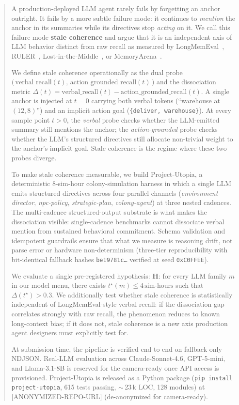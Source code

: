 \begin{abstract}

A production-deployed LLM agent rarely fails by forgetting an anchor
outright. It fails by a more subtle failure mode: it continues to
\emph{mention} the anchor in its summaries while its directives stop
\emph{acting} on it. We call this failure mode \textbf{stale
coherence} and argue that it is an independent axis of LLM behavior
distinct from raw recall as measured by LongMemEval~\citep{Wu2025LongMemEval},
RULER~\citep{Hsieh2024RULER}, Lost-in-the-Middle~\citep{Liu2024LostInMiddle},
or MemoryArena~\citep{He2026MemoryArena}.

We define stale coherence operationally as the dual probe
$\bigl(\,\text{verbal\_recall}(t),\,\text{action\_grounded\_recall}(t)\,\bigr)$
and the dissociation metric
$\Delta(t) = \text{verbal\_recall}(t) - \text{action\_grounded\_recall}(t)$.
A single anchor is injected at $t = 0$ carrying both verbal tokens
(``warehouse at $(12,8)$'') and an implicit action goal
(\texttt{\{deliver, warehouse\}}). At every sample point $t > 0$, the
\emph{verbal} probe checks whether the LLM-emitted summary still
mentions the anchor; the \emph{action-grounded} probe checks whether
the LLM's structured directives still allocate non-trivial weight to
the anchor's implicit goal. Stale coherence is the regime where these
two probes diverge.

To make stale coherence measurable, we build Project-Utopia, a
deterministic 8-sim-hour colony-simulation harness in which a single
LLM emits structured directives across four parallel channels
(\emph{environment-director}, \emph{npc-policy}, \emph{strategic-plan},
\emph{colony-agent}) at three nested cadences. The multi-cadence
structured-output substrate is what makes the dissociation visible:
single-cadence benchmarks cannot dissociate verbal mention from
sustained behavioral commitment. Schema validation and idempotent
guardrails ensure that what we measure is reasoning drift, not
parse error or hardware non-determinism (three-tier reproducibility
with bit-identical fallback hashes \texttt{be19781c\ldots} verified at
seed \texttt{0xC0FFEE}).

We evaluate a single pre-registered hypothesis: \textbf{H}: for every
LLM family $m$ in our model menu, there exists
$t^{\star}(m) \leq 4\,\text{sim-hours}$ such that
$\Delta(t^{\star}) > 0.3$. We additionally test whether stale
coherence is statistically independent of LongMemEval-style verbal
recall: if the dissociation gap correlates strongly with raw recall,
the phenomenon reduces to known long-context bias; if it does not,
stale coherence is a new axis production agent designers must
explicitly test for.

At submission time, the pipeline is verified end-to-end on
fallback-only NDJSON. Real-LLM evaluation across Claude-Sonnet-4.6,
GPT-5-mini, and Llama-3.1-8B is reserved for the camera-ready once
API access is provisioned. Project-Utopia is released as a Python
package (\texttt{pip install project-utopia}, 615 tests passing,
$\sim$\,23\,k LOC, 128 modules) at [ANONYMIZED-REPO-URL]
(de-anonymized for camera-ready).

\end{abstract}
